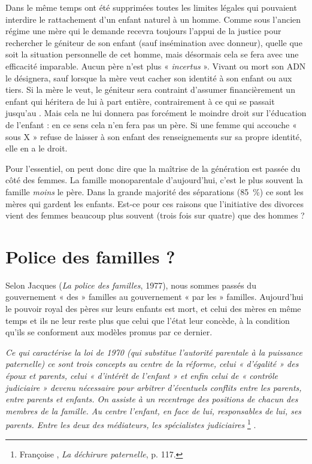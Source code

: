  Dans le même temps ont été supprimées toutes les limites légales qui pouvaient interdire le rattachement d'un enfant naturel à un homme. Comme sous l'ancien régime une mère qui le demande recevra toujours l'appui de la justice pour rechercher le géniteur de son enfant (sauf insémination avec donneur), quelle que soit la situation personnelle de cet homme, mais désormais cela se fera avec une efficacité  imparable. Aucun père n'est plus « \emph{incertus} ». Vivant ou mort son ADN le désignera, sauf lorsque la mère veut cacher son identité à son enfant ou aux tiers. Si la mère le veut, le géniteur sera contraint d'assumer financièrement un enfant qui héritera de lui à part entière, contrairement à ce qui se passait jusqu'au . Mais cela ne lui donnera pas forcément le moindre droit sur l'éducation de l'enfant : en ce sens cela n'en fera pas un père. Si une femme qui accouche « sous X » refuse de laisser à son enfant des renseignements sur sa propre identité, elle en a le droit. 

 Pour l'essentiel, on peut donc dire que la maîtrise de la génération est passée du côté des femmes. La famille monoparentale d'aujourd'hui, c'est le plus souvent la famille \emph{moins} le père. Dans la grande majorité des séparations (85~\%) ce sont les mères qui gardent les enfants. Est-ce pour ces raisons que l'initiative des divorces vient des femmes beaucoup plus souvent (trois fois sur quatre) que des hommes  ? 




  \section{Police des familles ?}
 
 
Selon Jacques  (\emph{La police des familles}, 1977), nous sommes passés du gouvernement « des » familles au gouvernement « par les » familles.  Aujourd'hui le pouvoir royal des pères sur leurs enfants est mort, et celui des mères en même temps et ils ne leur reste plus que celui que l'état leur concède, à la condition qu'ils se conforment aux modèles promus par ce dernier.

\begin{displayquote}
{\emph{Ce qui caractérise la loi de 1970 (qui substitue l'autorité parentale à la puissance paternelle) ce sont trois concepts au centre de la réforme, celui « d'égalité » des époux et parents, celui « d'intérêt de l'enfant » et enfin celui de « contrôle judiciaire » devenu nécessaire pour arbitrer d'éventuels conflits entre les parents, entre parents et enfants. On assiste à un recentrage des positions de chacun des membres de la famille. Au centre l'enfant, en face de lui, responsables de lui, ses parents. Entre les deux des médiateurs, les spécialistes judiciaires}%
\footnote{Françoise , \emph{La déchirure paternelle}, p. 117.}%
}.
\end{displayquote}


